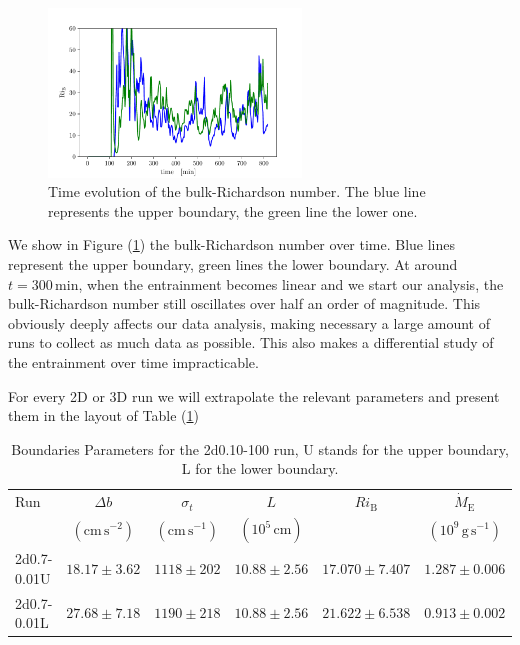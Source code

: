 \begin{figure}[t!]
\centering
\includegraphics[width=0.6\textwidth]{./img/bulk.pdf}
\caption{Time evolution of the bulk-Richardson number. The blue line represents the upper boundary, the green line the lower one.}
\label{fig:bulk}
\centering
\end{figure}
We show in Figure (\ref{fig:bulk}) the bulk-Richardson number over time. Blue lines represent the upper boundary, green lines the lower boundary. At around $t=\mathrm{300 \, min}$, when the entrainment becomes linear and we start our analysis, the bulk-Richardson number still oscillates over half an order of magnitude. This obviously deeply affects our data analysis, making necessary a large amount of runs to collect as much data as possible. This also makes a differential study of the entrainment over time impracticable. 

For every 2D or 3D run we will extrapolate the relevant parameters and present them in the layout of Table (\ref{2dsingletab})
 \begin{table}\caption{Boundaries Parameters for the 2d0.10-100 run, U stands for the upper boundary, L for the lower boundary.}
 \begin{tabular}{lccccc}
	 \toprule
	 Run &$\Delta b  $&$\sigma_t$ & $L$&$Ri_{\mathrm{B}}$&$\dot{M}_{\mathrm{E}}$ \\
		    & $(\mathrm{cm \, s^{-2}})$&$(\mathrm{cm \, s^{-1}})$&$(10^5 \, \mathrm{cm})$ & & $(10^9 \, \mathrm{g \, s^{-1}})$ \\
	  	\midrule
		2d0.7-0.01U&$ 18.17 \pm 3.62 $&$1118 \pm 202 $ &  $10.88 \pm 2.56 $ & $17.070 \pm 7.407 $ & $1.287 \pm 0.006$\\
		2d0.7-0.01L &$27.68 \pm 7.18$&$1190 \pm 218$ & $10.88 \pm 2.56$ &  $21.622 \pm 6.538$ & $0.913 \pm 0.002$\\
		\bottomrule
	\end{tabular}\label{2dsingletab}
 \end{table}

